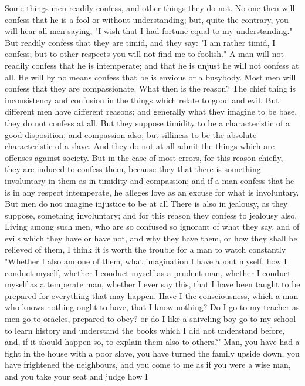 \documentclass[a4paper]{article}
\begin{document}
    Some things men readily confess, and other things they do not. No one then
will confess that he is a fool or without understanding; but, quite the
contrary, you will hear all men saying, "I wish that I had fortune equal to my
understanding." But readily confess that they are timid, and they say: "I am
rather timid, I confess; but to other respects you will not find me to
foolish." A man will not readily confess that he is intemperate; and that he is
unjust he will not confess at all. He will by no means confess that be is
envious or a busybody. Most men will confess that they are compassionate. What
then is the reason? The chief thing is inconsistency and confusion in the
things which relate to good and evil. But different men have different reasons;
and generally what they imagine to be base, they do not confess at all. But
they suppose timidity to be a characteristic of a good disposition, and
compassion also; but silliness to be the absolute characteristic of a slave.
And they do not at all admit the things which are offenses against society. But
in the case of most errors, for this reason chiefly, they are induced to
confess them, because they that there is something involuntary in them as in
timidity and compassion; and if a man confess that he is in any respect
intemperate, he alleges love as an excuse for what is involuntary. But men do
not imagine injustice to be at all There is also in jealousy, as they suppose,
something involuntary; and for this reason they confess to jealousy also.
    Living among such men, who are so confused so ignorant of what they say,
and of evils which they have or have not, and why they have them, or how they
shall be relieved of them, I think it is worth the trouble for a man to watch
constantly "Whether I also am one of them, what imagination I have about
myself, how I conduct myself, whether I conduct myself as a prudent man,
whether I conduct myself as a temperate man, whether I ever say this, that I
have been taught to be prepared for everything that may happen. Have I the
consciousness, which a man who knows nothing ought to have, that I know
nothing? Do I go to my teacher as men go to oracles, prepared to obey? or do I
like a sniveling boy go to my school to learn history and understand the books
which I did not understand before, and, if it should happen so, to explain them
also to others?" Man, you have had a fight in the house with a poor slave, you
have turned the family upside down, you have frightened the neighbours, and you
come to me as if you were a wise man, and you take your seat and judge how I
\end{document}
